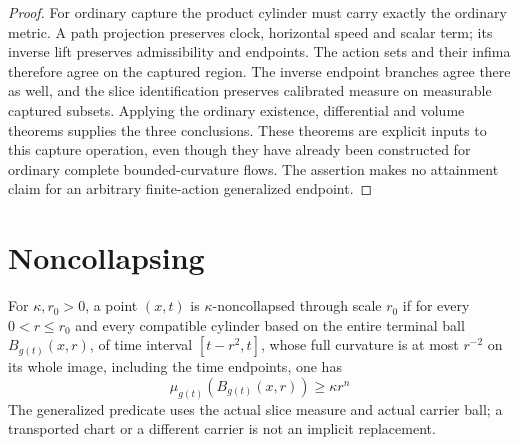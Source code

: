 \begin{proof}
For ordinary capture the product cylinder must carry exactly the ordinary
metric.  A path projection preserves clock, horizontal speed and scalar
term; its inverse lift preserves admissibility and endpoints.  The action
sets and their infima therefore agree on the captured region.  The inverse
endpoint branches agree there as well, and the slice identification preserves
calibrated measure on measurable captured subsets.  Applying the ordinary
existence, differential and volume theorems supplies the three conclusions.
These theorems are explicit inputs to this capture operation, even though
they have already been constructed for ordinary complete bounded-curvature
flows.  The assertion makes no attainment claim for an arbitrary finite-action
generalized endpoint.
\end{proof}

\section{Noncollapsing}

\begin{definition}
\label{def:parabolic-noncollapse}
For $\kappa,r_0>0$, a point $(x,t)$ is $\kappa$-noncollapsed through scale
$r_0$ if for every $0<r\leq r_0$ and every compatible cylinder based on
the entire terminal ball $B_{g(t)}(x,r)$, of time interval $[t-r^2,t]$,
whose full curvature is at most $r^{-2}$ on its whole image, including the
time endpoints, one has
\[
 \mu_{g(t)}(B_{g(t)}(x,r))\geq\kappa r^n
\]
The generalized predicate uses the actual slice measure
and actual carrier ball; a transported chart or a different carrier is not an
implicit replacement.
\end{definition}

